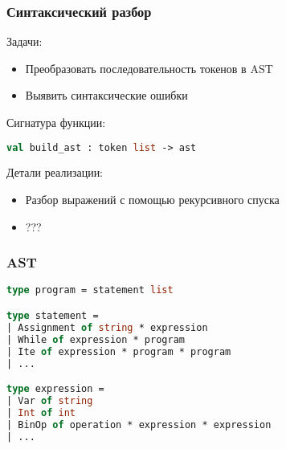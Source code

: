 \documentclass{beamer}
\begin{document}
	\begin{frame}[fragile]
		\frametitle{Синтаксический разбор}
		Задачи:
		\begin{itemize}
			\item Преобразовать последовательность токенов в AST
			\item Выявить синтаксические ошибки
		\end{itemize}
		Сигнатура функции:	
		\begin{lstlisting}[language=ML] 
		val build_ast : token list -> ast
		\end{lstlisting}
		Детали реализации:
		\begin{itemize}
			\item Разбор выражений с помощью рекурсивного спуска
			\item ???
		\end{itemize}
		\end{frame}
	
	\begin{frame}[fragile]
		\frametitle{AST}
		\begin{lstlisting}[language=ML] 
type program = statement list

type statement =
| Assignment of string * expression
| While of expression * program
| Ite of expression * program * program
| ...

type expression =
| Var of string
| Int of int
| BinOp of operation * expression * expression
| ...
		\end{lstlisting}
	\end{frame}
	
\end{document}
